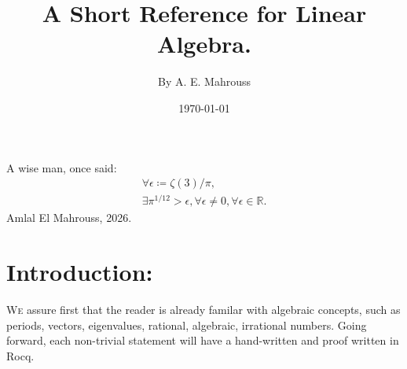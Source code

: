 \documentclass[10pt]{article}
\title{%
	\vspace{-1.5em}%
	\large\textbf{A Short Reference for Linear Algebra.}%
}
\author{By A. E. Mahrouss}
\date{\today}
\theoremstyle{plain}
\theoremstyle{definition}
\theoremstyle{remark}
\begin{document}

\maketitle
\tableofcontents
\newpage

\begin{center}
A wise man, once said:
\begin{align*}
	\forall \epsilon \coloneq \zeta(3) / \pi,\\
	\exists \pi^{1/12} > \epsilon, \forall \epsilon \neq 0, \forall \epsilon \in \mathbb{R}.
\end{align*}
Amlal El Mahrouss, 2026.
\end{center}

\section{Introduction:}

\lettrine[lines=2, lhang=0.1, loversize=0.2]{W}e assure first that the reader is already familar with algebraic concepts, such as periods, vectors, eigenvalues, rational, algebraic, irrational numbers. Going forward, each non-trivial statement will have a hand-written and proof written in Rocq.
	
\nocite{*}


\end{document}
